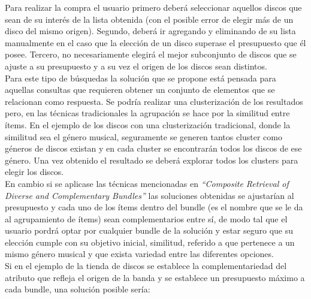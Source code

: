 Para realizar la compra el usuario primero deberá seleccionar aquellos discos que sean de su interés de la lista obtenida (con el posible error de elegir más de un disco del mismo origen). Segundo, deberá ir agregando y eliminando de su lista manualmente en el caso que la elección de un disco superase el presupuesto que él posee. Tercero, no necesariamente elegirá el mejor subconjunto de discos que se ajuste a su presupuesto y a su vez el origen de los discos sean distintos.\\
Para este tipo de búsquedas la solución que se propone está pensada para aquellas consultas que requieren obtener un conjunto de elementos que se relacionan como respuesta. Se podría realizar una clusterización de los resultados pero, en las técnicas tradicionales la agrupación se hace por la similitud entre ítems. En el ejemplo de los discos con una clusterización tradicional, donde la similitud sea el género musical, seguramente se generen tantos cluster como géneros de discos existan y en cada cluster se encontrarán todos los discos de ese género. Una vez obtenido el resultado se deberá explorar todos los clusters para elegir los discos.\\
En cambio si se aplicase las técnicas mencionadas en \textit{``Composite Retrieval of Diverse and Complementary Bundles''} las soluciones obtenidas se ajustarían al presupuesto y cada uno de los ítems dentro del bundle (es el nombre que se le da al agrupamiento de ítems) sean complementarios entre sí, de modo tal que el usuario pordrá optar por cualquier bundle de la solución y estar seguro que su elección cumple con su objetivo inicial, similitud, referido a que pertenece a un mismo género musical y que exista variedad entre las diferentes opciones.\\
Si en el ejemplo de la tienda de discos se establece la complementariedad del atributo que refleja el origen de la banda y se establece un presupuesto máximo a cada bundle, una solución posible sería:
